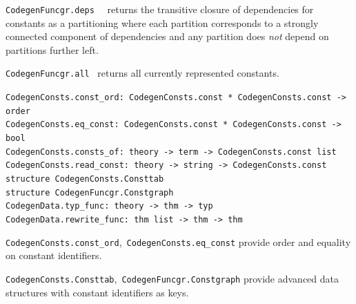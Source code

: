 \begin{isabellebody}
\begin{isamarkuptext}
\begin{description}
  \item \verb|CodegenFuncgr.deps|~~
    returns the transitive closure of dependencies for
    constants  as a partitioning where each partition
    corresponds to a strongly connected component of
    dependencies and any partition does \emph{not}
    depend on partitions further left.

  \item \verb|CodegenFuncgr.all|~
    returns all currently represented constants.

  \end{description}%
\end{isamarkuptext}%
\isamarkuptrue%
%
\endisatagmlref
{\isafoldmlref}%
%
\isadelimmlref
%
\endisadelimmlref
%
\isamarkuptrue%
%
\isadelimmlref
%
\endisadelimmlref
%
\isatagmlref
%
\begin{isamarkuptext}%
\begin{mldecls}
  \verb|CodegenConsts.const_ord: CodegenConsts.const * CodegenConsts.const -> order| \\
  \verb|CodegenConsts.eq_const: CodegenConsts.const * CodegenConsts.const -> bool| \\
  \verb|CodegenConsts.consts_of: theory -> term -> CodegenConsts.const list| \\
  \verb|CodegenConsts.read_const: theory -> string -> CodegenConsts.const| \\
  \verb|structure CodegenConsts.Consttab| \\
  \verb|structure CodegenFuncgr.Constgraph| \\
  \verb|CodegenData.typ_func: theory -> thm -> typ| \\
  \verb|CodegenData.rewrite_func: thm list -> thm -> thm| \\
  \end{mldecls}

  \begin{description}

  \item \verb|CodegenConsts.const_ord|,~\verb|CodegenConsts.eq_const|
     provide order and equality on constant identifiers.

  \item \verb|CodegenConsts.Consttab|,~\verb|CodegenFuncgr.Constgraph|
     provide advanced data structures with constant identifiers as keys.


\end{description}
\end{isamarkuptext}
\end{isabellebody}
